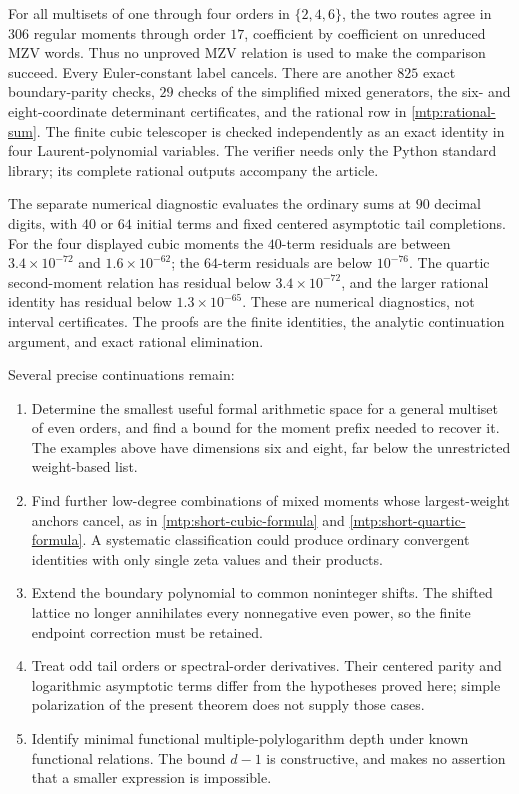 For all multisets of one through four orders in $\{2,4,6\}$, the two
routes agree in $306$ regular moments through order $17$, coefficient
by coefficient on unreduced MZV words. Thus no unproved MZV relation
is used to make the comparison succeed. Every Euler-constant label
cancels. There are another $825$ exact boundary-parity checks,
$29$ checks of the simplified mixed generators, the six- and
eight-coordinate determinant certificates, and the rational row in
\eqref{mtp:rational-sum}. The finite cubic telescoper is checked
independently as an exact identity in four Laurent-polynomial variables.
The verifier needs only the Python standard
library; its complete rational outputs accompany the article.

The separate numerical diagnostic evaluates the ordinary sums at
$90$ decimal digits, with $40$ or $64$ initial terms and fixed centered
asymptotic tail completions. For the four displayed cubic moments the
$40$-term residuals are between $3.4\times10^{-72}$ and
$1.6\times10^{-62}$; the $64$-term residuals are below $10^{-76}$.
The quartic second-moment relation has residual below $3.4\times10^{-72}$,
and the larger rational identity has residual below $1.3\times10^{-65}$.
These are numerical diagnostics, not interval certificates. The proofs
are the finite identities, the analytic continuation argument, and
exact rational elimination.

Several precise continuations remain:
\begin{enumerate}
\item Determine the smallest useful formal arithmetic space for a
      general multiset of even orders, and find a bound for the moment
      prefix needed to recover it. The examples above have dimensions
      six and eight, far below the unrestricted weight-based list.
\item Find further low-degree combinations of mixed moments whose
      largest-weight anchors cancel, as in
      \eqref{mtp:short-cubic-formula} and \eqref{mtp:short-quartic-formula}.
      A systematic classification could produce ordinary convergent
      identities with only single zeta values and their products.
\item Extend the boundary polynomial to common noninteger shifts.
      The shifted lattice no longer annihilates every nonnegative even
      power, so the finite endpoint correction must be retained.
\item Treat odd tail orders or spectral-order derivatives. Their
      centered parity and logarithmic asymptotic terms differ from the
      hypotheses proved here; simple polarization of the present
      theorem does not supply those cases.
\item Identify minimal functional multiple-polylogarithm depth under
      known functional relations. The bound $d-1$ is constructive,
      and makes no assertion that a smaller expression is impossible.
\end{enumerate}
